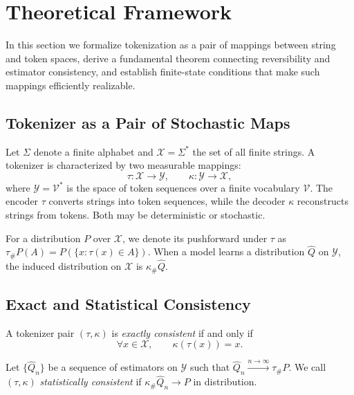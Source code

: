 \section{Theoretical Framework}
\label{sec:theory}

In this section we formalize tokenization as a pair of mappings between
string and token spaces, derive a fundamental theorem connecting
reversibility and estimator consistency, and establish finite-state
conditions that make such mappings efficiently realizable.

\subsection{Tokenizer as a Pair of Stochastic Maps}

Let $\Sigma$ denote a finite alphabet and
$\mathcal{X}=\Sigma^{*}$ the set of all finite strings.
A tokenizer is characterized by two measurable mappings:
\[
\tau:\mathcal{X}\to\mathcal{Y},\qquad
\kappa:\mathcal{Y}\to\mathcal{X},
\]
where $\mathcal{Y}=\mathcal{V}^{*}$ is the space of token sequences over a
finite vocabulary $\mathcal{V}$.
The encoder $\tau$ converts strings into token sequences,
while the decoder $\kappa$ reconstructs strings from tokens.
Both may be deterministic or stochastic.

For a distribution $P$ over $\mathcal{X}$, we denote its
pushforward under $\tau$ as
$\tau_{\#}P(A)=P(\{x:\tau(x)\in A\})$.
When a model learns a distribution $\hat Q$ on $\mathcal{Y}$,
the induced distribution on $\mathcal{X}$ is
$\kappa_{\#}\hat Q$.

\subsection{Exact and Statistical Consistency}

\begin{definition}
A tokenizer pair $(\tau,\kappa)$ is \emph{exactly consistent}
if and only if
\[
\forall x\in\mathcal{X},\qquad
\kappa(\tau(x))=x.
\]
\end{definition}

\begin{definition}
Let $\{\hat Q_n\}$ be a sequence of estimators on $\mathcal{Y}$ such that
$\hat Q_n\xrightarrow{n\to\infty}\tau_{\#}P$.
We call $(\tau,\kappa)$ \emph{statistically consistent}
if $\kappa_{\#}\hat Q_n \to P$ in distribution.
\end{definition}

